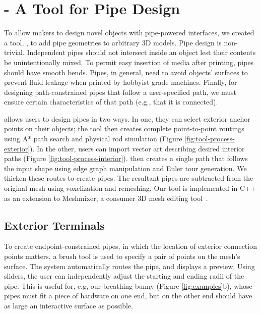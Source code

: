 \section{\systemname - A Tool for Pipe Design}
To allow makers to design novel objects with pipe-powered interfaces, we created a tool, \systemnamenospace, to add pipe geometries to arbitrary 3D models. Pipe design is non-trivial.  Independent pipes should not intersect inside an object lest their contents be unintentionally mixed.  To permit easy insertion of media after printing, pipes should have smooth bends.  Pipes, in general, need to avoid objects' surfaces to prevent fluid leakage when printed by hobbyist-grade machines.  Finally, for designing path-constrained pipes that follow a user-specified path, we must ensure certain characteristics of that path (e.g., that it is connected). 

\systemname allows users to design pipes in two ways. In one, they can select exterior anchor points on their objects; the tool then creates complete point-to-point routings using A* path search and physical rod simulation (Figure \ref{fig:tool-process-exterior}). In the other, users can import vector art describing desired interior paths (Figure \ref{fig:tool-process-interior}).  \systemname then creates a single path that follows the input shape using edge graph manipulation and Euler tour generation.  We thicken these routes to create pipes.  The resultant pipes are subtracted from the original mesh using voxelization and remeshing. Our tool is implemented in C++ as an extension to Meshmixer, a consumer 3D mesh editing tool~\cite{Schmidt-meshmixer}.

\subsection{Exterior Terminals}

To create endpoint-constrained pipes, in which the location of exterior connection points matters, a brush tool is used to specify a pair of points on the mesh's surface. The system automatically routes the pipe, and displays a preview.  Using sliders, the user can independently adjust the starting and ending radii of the pipe.  This is useful for, e.g, our breathing bunny (Figure \ref{fig:examples}b), whose pipes must fit a piece of hardware on one end, but on the other end should have as large an interactive surface as possible.

